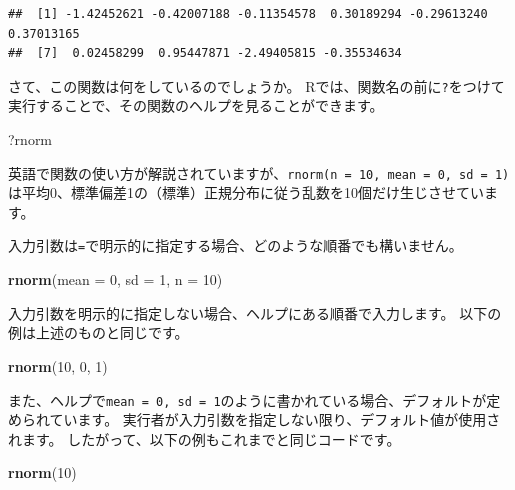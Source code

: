 \documentclass[]{bxjsreport}
\newenvironment{Shaded}{\begin{snugshade}}{\end{snugshade}}
\newcommand{\DataTypeTok}[1]{\textcolor[rgb]{0.13,0.29,0.53}{#1}}
\newcommand{\DecValTok}[1]{\textcolor[rgb]{0.00,0.00,0.81}{#1}}
\newcommand{\KeywordTok}[1]{\textcolor[rgb]{0.13,0.29,0.53}{\textbf{#1}}}
\newcommand{\NormalTok}[1]{#1}
\begin{document}
\begin{verbatim}
##  [1] -1.42452621 -0.42007188 -0.11354578  0.30189294 -0.29613240  0.37013165
##  [7]  0.02458299  0.95447871 -2.49405815 -0.35534634
\end{verbatim}

さて、この関数は何をしているのでしょうか。
Rでは、関数名の前に\texttt{?}をつけて実行することで、その関数のヘルプを見ることができます。

\begin{Shaded}
\begin{Highlighting}[]
\NormalTok{?rnorm}
\end{Highlighting}
\end{Shaded}

英語で関数の使い方が解説されていますが、\texttt{rnorm(n\ =\ 10,\ mean\ =\ 0,\ sd\ =\ 1)}は平均0、標準偏差1の（標準）正規分布に従う乱数を10個だけ生じさせています。

入力引数は\texttt{=}で明示的に指定する場合、どのような順番でも構いません。

\begin{Shaded}
\begin{Highlighting}[]
\KeywordTok{rnorm}\NormalTok{(}\DataTypeTok{mean =} \DecValTok{0}\NormalTok{, }\DataTypeTok{sd =} \DecValTok{1}\NormalTok{, }\DataTypeTok{n =} \DecValTok{10}\NormalTok{)}
\end{Highlighting}
\end{Shaded}

入力引数を明示的に指定しない場合、ヘルプにある順番で入力します。
以下の例は上述のものと同じです。

\begin{Shaded}
\begin{Highlighting}[]
\KeywordTok{rnorm}\NormalTok{(}\DecValTok{10}\NormalTok{, }\DecValTok{0}\NormalTok{, }\DecValTok{1}\NormalTok{)}
\end{Highlighting}
\end{Shaded}

また、ヘルプで\texttt{mean\ =\ 0,\ sd\ =\ 1}のように書かれている場合、デフォルトが定められています。
実行者が入力引数を指定しない限り、デフォルト値が使用されます。
したがって、以下の例もこれまでと同じコードです。

\begin{Shaded}
\begin{Highlighting}[]
\KeywordTok{rnorm}\NormalTok{(}\DecValTok{10}\NormalTok{)}
\end{Highlighting}
\end{Shaded}
\end{document}
